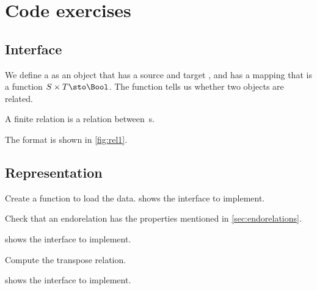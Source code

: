 \section{\usebox{\chaptergear}
  Code exercises}

\subsection*{Interface}

We define a \Relation as an object that has a source and target \Setoid, and has a mapping that is a function $S \times T \sto \Bool$.
The function tells us whether two objects are related.


A finite relation  is a relation between \FiniteSet\,s.


The format is shown in \cref{fig:rel1}.

\subsection*{Representation}{}

\begin{marginfigure}
    \caption{}
    \label{fig:rel1}
\end{marginfigure}

\begin{codeexercise}
    Create a function to load the data.
     shows the interface to implement.

\end{codeexercise}


\begin{codeexercise}

    Check that an endorelation has the properties mentioned in \cref{sec:endorelations}.

     shows the interface to implement.
\end{codeexercise}


\begin{codeexercise}
    Compute the transpose relation.

     shows the interface to implement.
\end{codeexercise}

